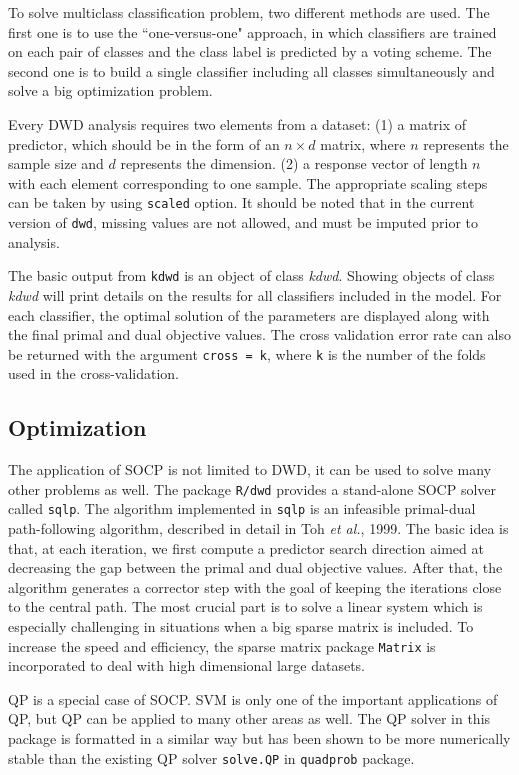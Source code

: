 \documentclass{bioinfo}
\begin{document}
To solve multiclass classification problem, two different methods are used. The
first one is to use the ``one-versus-one" approach, in which classifiers 
are trained on each pair of classes and the class label is predicted by a voting
scheme. The second one is to build a single classifier including all classes
simultaneously and solve a big optimization problem.

Every DWD analysis requires two elements from a dataset: (1) a matrix of 
predictor, which should be in the form of an $n \times d$ matrix, where $n$
represents the sample size and $d$ represents the dimension. (2) a response
vector of length $n$ with each element corresponding to one sample. The
appropriate scaling steps can be taken by using \texttt{scaled} option. It
should be noted that in the current version of \texttt{dwd}, missing values are
not allowed, and must be imputed prior to analysis.

The basic output from \texttt{kdwd} is an object of class {\em kdwd}. Showing
objects of class {\em kdwd} will print details on the results for all
classifiers included in the model. For each classifier, the optimal solution of the
parameters are displayed along with the final primal and dual objective values.
The cross validation error rate can also be returned with the argument
\texttt{cross = k}, where \texttt{k} is the number of the folds used in the
cross-validation.

\subsection{Optimization}
The application of SOCP is not limited to DWD, it can be used to solve many
other problems as well. The package \texttt{R/dwd} provides a stand-alone SOCP
solver called \texttt{sqlp}. The algorithm implemented in \texttt{sqlp} is an
infeasible primal-dual path-following algorithm, described in detail in Toh {\em
et al.}, 1999. The basic idea is that, at each iteration, we first compute a
predictor search direction aimed at decreasing the gap between the primal and dual
objective values. After that, the algorithm generates a corrector step with the
goal of keeping the iterations close to the central path. The most crucial
part is to solve a linear system which is especially challenging in situations
when a big sparse matrix is included. To increase the speed and efficiency, the
sparse matrix package \texttt{Matrix} is incorporated to deal with high
dimensional large datasets.

QP is a special case of SOCP. SVM is only one of the important applications
of QP, but QP can be applied to many other areas as well. The QP solver in this
package is formatted in a similar way but has been shown to be more numerically
stable than the existing QP solver \texttt{solve.QP} in \texttt{quadprob} package.
\end{document}
